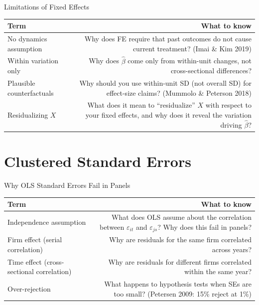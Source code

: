\documentclass[9pt,aspectratio=169]{beamer}
\begin{document}
\begin{frame}{Limitations of Fixed Effects}

\begin{tabular}{@{}lR@{}}
\toprule
\textbf{Term} & \textbf{What to know} \\
\midrule
\alert{No dynamics assumption} & Why does FE require that past outcomes do not cause current treatment? (Imai \& Kim 2019) \\[0.8em]
\alert{Within variation only} & Why does $\hat{\beta}$ come only from within-unit changes, not cross-sectional differences? \\[0.8em]
\alert{Plausible counterfactuals} & Why should you use within-unit SD (not overall SD) for effect-size claims? (Mummolo \& Peterson 2018) \\[0.8em]
\alert{Residualizing $X$} & What does it mean to ``residualize'' $X$ with respect to your fixed effects, and why does it reveal the variation driving $\hat{\beta}$? \\
\bottomrule
\end{tabular}

\end{frame}


\section{Clustered Standard Errors}

\begin{frame}{Why OLS Standard Errors Fail in Panels}

\begin{tabular}{@{}lR@{}}
\toprule
\textbf{Term} & \textbf{What to know} \\
\midrule
\alert{Independence assumption} & What does OLS assume about the correlation between $\varepsilon_{it}$ and $\varepsilon_{js}$? Why does this fail in panels? \\[0.8em]
\alert{Firm effect (serial correlation)} & Why are residuals for the same firm correlated across years? \\[0.8em]
\alert{Time effect (cross-sectional correlation)} & Why are residuals for different firms correlated within the same year? \\[0.8em]
\alert{Over-rejection} & What happens to hypothesis tests when SEs are too small? (Petersen 2009: 15\% reject at 1\%) \\
\bottomrule
\end{tabular}

\end{frame}
\end{document}
